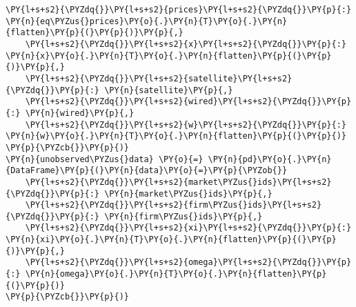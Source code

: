 \begin{tcolorbox}[breakable, size=fbox, boxrule=1pt, pad at break*=1mm,colback=cellbackground, colframe=cellborder]
\begin{Verbatim}[commandchars=\\\{\}]
    \PY{l+s+s2}{\PYZdq{}}\PY{l+s+s2}{prices}\PY{l+s+s2}{\PYZdq{}}\PY{p}{:} \PY{n}{eq\PYZus{}prices}\PY{o}{.}\PY{n}{T}\PY{o}{.}\PY{n}{flatten}\PY{p}{(}\PY{p}{)}\PY{p}{,}
    \PY{l+s+s2}{\PYZdq{}}\PY{l+s+s2}{x}\PY{l+s+s2}{\PYZdq{}}\PY{p}{:} \PY{n}{x}\PY{o}{.}\PY{n}{T}\PY{o}{.}\PY{n}{flatten}\PY{p}{(}\PY{p}{)}\PY{p}{,}
    \PY{l+s+s2}{\PYZdq{}}\PY{l+s+s2}{satellite}\PY{l+s+s2}{\PYZdq{}}\PY{p}{:} \PY{n}{satellite}\PY{p}{,}
    \PY{l+s+s2}{\PYZdq{}}\PY{l+s+s2}{wired}\PY{l+s+s2}{\PYZdq{}}\PY{p}{:} \PY{n}{wired}\PY{p}{,}
    \PY{l+s+s2}{\PYZdq{}}\PY{l+s+s2}{w}\PY{l+s+s2}{\PYZdq{}}\PY{p}{:} \PY{n}{w}\PY{o}{.}\PY{n}{T}\PY{o}{.}\PY{n}{flatten}\PY{p}{(}\PY{p}{)}
\PY{p}{\PYZcb{}}\PY{p}{)}
\PY{n}{unobserved\PYZus{}data} \PY{o}{=} \PY{n}{pd}\PY{o}{.}\PY{n}{DataFrame}\PY{p}{(}\PY{n}{data}\PY{o}{=}\PY{p}{\PYZob{}}
    \PY{l+s+s2}{\PYZdq{}}\PY{l+s+s2}{market\PYZus{}ids}\PY{l+s+s2}{\PYZdq{}}\PY{p}{:} \PY{n}{market\PYZus{}ids}\PY{p}{,}
    \PY{l+s+s2}{\PYZdq{}}\PY{l+s+s2}{firm\PYZus{}ids}\PY{l+s+s2}{\PYZdq{}}\PY{p}{:} \PY{n}{firm\PYZus{}ids}\PY{p}{,}
    \PY{l+s+s2}{\PYZdq{}}\PY{l+s+s2}{xi}\PY{l+s+s2}{\PYZdq{}}\PY{p}{:} \PY{n}{xi}\PY{o}{.}\PY{n}{T}\PY{o}{.}\PY{n}{flatten}\PY{p}{(}\PY{p}{)}\PY{p}{,}
    \PY{l+s+s2}{\PYZdq{}}\PY{l+s+s2}{omega}\PY{l+s+s2}{\PYZdq{}}\PY{p}{:} \PY{n}{omega}\PY{o}{.}\PY{n}{T}\PY{o}{.}\PY{n}{flatten}\PY{p}{(}\PY{p}{)}
\PY{p}{\PYZcb{}}\PY{p}{)}
\end{Verbatim}
\end{tcolorbox}

